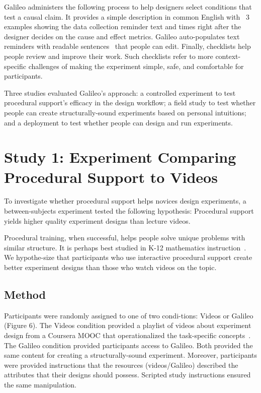 Galileo administers the following process to help designers select conditions that test a causal claim. It provides a simple description in common English with ~3 examples showing the data collection reminder text and times right after the designer decides on the cause and effect metrics. Galileo auto-populates text reminders with readable sentences~\cite{Levy2013} that people can edit. Finally, checklists help people review and improve their work. Such checklists refer to more context-specific challenges of making the experiment simple, safe, and comfortable for participants.
 
Three studies evaluated Galileo’s approach: a controlled experiment to test procedural support’s efficacy in the design workflow; a field study to test whether people can create structurally-sound experiments based on personal intuitions; and a deployment to test whether people can design and run experiments. 

\section{Study 1: Experiment Comparing Procedural Support to Videos}
To investigate whether procedural support helps novices design experiments, a between-subjects experiment tested the following hypothesis: Procedural support yields higher quality experiment designs than lecture videos. 

Procedural training, when successful, helps people solve unique problems with similar structure. It is perhaps best studied in K-12 mathematics instruction~\cite{Rittle-Johnson1999}. We hypothe-size that participants who use interactive procedural support create better experiment designs than those who watch videos on the topic. 

\subsection{Method}
Participants were randomly assigned to one of two condi-tions: Videos or Galileo (Figure 6). The Videos condition provided a playlist of videos about experiment design from a Coursera MOOC that operationalized the task-specific concepts~\cite{Wobbrock2018}. The Galileo condition provided participants access to Galileo. Both provided the same content for creating a structurally-sound experiment. Moreover, participants were provided instructions that the resources (videos/Galileo) described the attributes that their designs should possess. Scripted study instructions ensured the same manipulation. 

